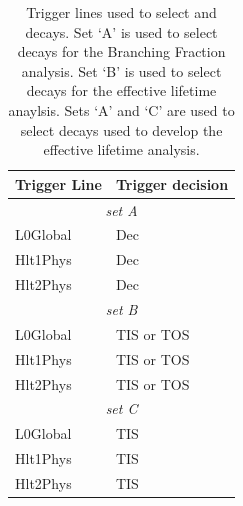 \begin{table}[htbp]
\begin{center}
\begin{tabular}{ll}
\hline
Trigger Line	& Trigger decision \\ \hline
\multicolumn{2}{c}{{\it set A}} \\ \hline
L0Global	& Dec\\
Hlt1Phys	& Dec \\
Hlt2Phys	& Dec \\ \hline
\multicolumn{2}{c}{{\it set B}} \\ \hline
L0Global	& TIS or TOS \\
Hlt1Phys	& TIS or TOS \\
Hlt2Phys	& TIS or TOS \\ \hline
\multicolumn{2}{c}{{\it set C}} \\ \hline
L0Global	& TIS\\
Hlt1Phys	& TIS \\
Hlt2Phys	& TIS \\ \hline
\end{tabular}
\vspace{0.7cm}
\caption{Trigger lines used to select \bsmumu and \bhh decays. Set `A' is used to select decays for the Branching Fraction analysis. Set `B' is used to select \bsmumu decays for the effective lifetime anaylsis. Sets `A' and `C' are used to select \bhh decays used to develop the \bsmumu effective lifetime analysis.}
\label{tab:triggers}
\end{center}
\end{table}


